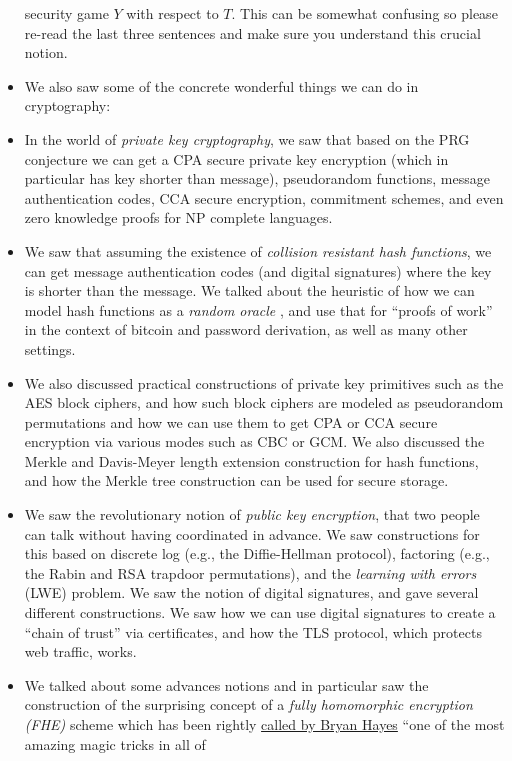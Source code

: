 \begin{itemize}
  security game \(Y\) with respect to \(T\). This can be somewhat
  confusing so please re-read the last three sentences and make sure you
  understand this crucial notion.
\item
  We also saw some of the concrete wonderful things we can do in
  cryptography:
\item
  In the world of \emph{private key cryptography}, we saw that based on
  the PRG conjecture we can get a CPA secure private key encryption
  (which in particular has key shorter than message), pseudorandom
  functions, message authentication codes, CCA secure encryption,
  commitment schemes, and even zero knowledge proofs for NP complete
  languages.
\item
  We saw that assuming the existence of \emph{collision resistant hash
  functions}, we can get message authentication codes (and digital
  signatures) where the key is shorter than the message. We talked about
  the heuristic of how we can model hash functions as a \emph{random
  oracle} , and use that for ``proofs of work'' in the context of
  bitcoin and password derivation, as well as many other settings.
\item
  We also discussed practical constructions of private key primitives
  such as the AES block ciphers, and how such block ciphers are modeled
  as pseudorandom permutations and how we can use them to get CPA or CCA
  secure encryption via various modes such as CBC or GCM. We also
  discussed the Merkle and Davis-Meyer length extension construction for
  hash functions, and how the Merkle tree construction can be used for
  secure storage.
\item
  We saw the revolutionary notion of \emph{public key encryption}, that
  two people can talk without having coordinated in advance. We saw
  constructions for this based on discrete log (e.g., the Diffie-Hellman
  protocol), factoring (e.g., the Rabin and RSA trapdoor permutations),
  and the \emph{learning with errors} (LWE) problem. We saw the notion
  of digital signatures, and gave several different constructions. We
  saw how we can use digital signatures to create a ``chain of trust''
  via certificates, and how the TLS protocol, which protects web
  traffic, works.
\item
  We talked about some advances notions and in particular saw the
  construction of the surprising concept of a \emph{fully homomorphic
  encryption (FHE)} scheme which has been rightly
  \href{http://bit-player.org/2012/computing-with-encrypted-data}{called
  by Bryan Hayes} ``one of the most amazing magic tricks in all of

\end{itemize}
